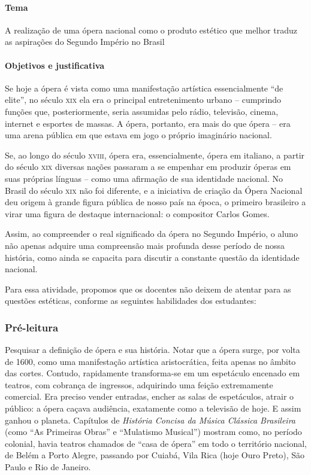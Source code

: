 \documentclass[11pt]{extarticle}
\begin{document}
\paragraph{Tema} A realização de uma ópera nacional como o produto estético que melhor
traduz as aspirações do Segundo Império no Brasil 

\paragraph{Objetivos e justificativa}

Se hoje a ópera é vista como uma manifestação artística essencialmente “de
elite”, no século \textsc{xix} ela era o principal entretenimento urbano – cumprindo
funções que, posteriormente, seria assumidas pelo rádio, televisão, cinema,
internet e esportes de massas. A ópera, portanto, era mais do que ópera – era
uma arena pública em que estava em jogo o próprio imaginário nacional.

Se, ao longo do século \textsc{xviii}, ópera era, essencialmente, ópera em italiano, a
partir do século \textsc{xix} diversas nações passaram a se empenhar em produzir óperas
em suas próprias línguas – como uma afirmação de sua identidade nacional. No
Brasil do século \textsc{xix} não foi diferente, e a iniciativa de criação da Ópera
Nacional deu origem à grande figura pública de nosso país na época, o primeiro
brasileiro a virar uma figura de destaque internacional: o compositor Carlos
Gomes.


Assim, ao compreender o real significado da ópera no Segundo Império, o aluno
não apenas adquire uma compreensão mais profunda desse período de nossa
história, como ainda se capacita para discutir a constante questão da
identidade nacional.

Para essa atividade, propomos que os docentes não deixem de atentar para as questões estéticas, conforme as seguintes habilidades dos estudantes:


\subsubsection{Pré-leitura}

Pesquisar a definição de ópera e sua história. Notar que a ópera surge, por
volta de 1600, como uma manifestação artística aristocrática, feita apenas no
âmbito das cortes. Contudo, rapidamente transforma-se em um espetáculo encenado
em teatros, com cobrança de ingressos, adquirindo uma feição extremamente
comercial. Era preciso vender entradas, encher as salas de espetáculos, atrair
o público: a ópera caçava audiência, exatamente como a televisão de hoje. E
assim ganhou o planeta. Capítulos de \emph{História Concisa da Música
Clássica Brasileira} (como ``As Primeiras Obras'' e ``Mulatismo Musical'') mostram como,
no período colonial, havia teatros chamados de “casa de ópera” em todo o
território nacional, de Belém a Porto Alegre, passando por Cuiabá, Vila Rica
(hoje Ouro Preto), São Paulo e Rio de Janeiro.
\end{document}
